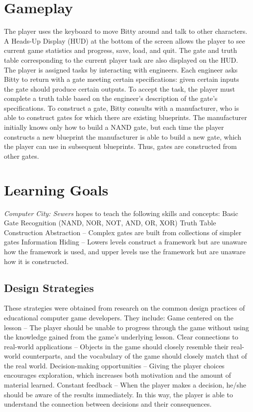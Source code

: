 \documentclass[12pt]{article}	%
\begin{document}
{\section*{Gameplay}
The player uses the keyboard to move Bitty around and talk to other characters.  A Heads-Up Display (HUD) at the bottom of the screen allows the player to see current game statistics and progress, save, load, and quit.  The gate and truth table corresponding to the current player task are also displayed on the HUD.
The player is assigned tasks by interacting with engineers.  Each engineer asks Bitty to return with a gate meeting certain specifications:  given certain inputs the gate should produce certain outputs.  To accept the task, the player must complete a truth table based on the engineer's description of the gate's specifications.  
To construct a gate, Bitty consults with a manufacturer, who is able to construct gates for which there are existing blueprints.  The manufacturer initially knows only how to build a NAND gate, but each time the player constructs a new blueprint the manufacturer is able to build a new gate, which the player can use in subsequent blueprints.  Thus, gates are constructed from other gates.

\section{Learning Goals}
{\textit{Computer City:  Sewers} hopes to teach the following skills and concepts:
Basic Gate Recognition (NAND, NOR, NOT, AND, OR, XOR)
Truth Table Construction
Abstraction -- Complex gates are built from collections of simpler gates
Information Hiding -- Lowers levels construct a framework but are unaware how the framework is used, and upper levels use the framework but are unaware how it is constructed.

\subsection*{Design Strategies}
These strategies were obtained from research on the common design practices of educational computer game developers.  They include:
Game centered on the lesson -- The player should be unable to progress through the game without using the knowledge gained from the game's underlying lesson.
Clear connections to real-world applications -- Objects in the game should closely resemble their real-world counterparts, and the vocabulary of the game should closely match that of the real world.
Decision-making opportunities -- Giving the player choices encourages exploration, which increases both motivation and the amount of material learned.
Constant feedback -- When the player makes a decision, he/she should be aware of the results immediately.  In this way, the player is able to understand the connection between decisions and their consequences.

}}
\end{document}
